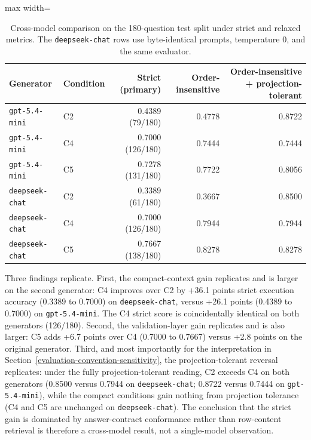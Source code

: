 \documentclass[cmc,article,submit,moreauthors,pdftex]{Definitions/tsp}
\begin{document}
\begin{table}[H]
\tablesize{\small}
\caption{Cross-model comparison on the 180-question test split under strict and relaxed metrics. The \texttt{deepseek-chat} rows use byte-identical prompts, temperature 0, and the same evaluator.}
\label{tab:second-model}
\centering
\begin{adjustbox}{max width=\textwidth}
\begin{tabular}{llrrr}
\toprule
\textbf{Generator} & \textbf{Condition} & \textbf{Strict (primary)} & \textbf{Order-insensitive} & \textbf{Order-insensitive + projection-tolerant} \\
\midrule
\texttt{gpt-5.4-mini} & C2 & 0.4389 (79/180) & 0.4778 & 0.8722 \\
\texttt{gpt-5.4-mini} & C4 & 0.7000 (126/180) & 0.7444 & 0.7444 \\
\texttt{gpt-5.4-mini} & C5 & 0.7278 (131/180) & 0.7722 & 0.8056 \\
\midrule
\texttt{deepseek-chat} & C2 & 0.3389 (61/180) & 0.3667 & 0.8500 \\
\texttt{deepseek-chat} & C4 & 0.7000 (126/180) & 0.7944 & 0.7944 \\
\texttt{deepseek-chat} & C5 & 0.7667 (138/180) & 0.8278 & 0.8278 \\
\bottomrule
\end{tabular}
\end{adjustbox}
\end{table}

Three findings replicate. First, the compact-context gain replicates and is larger on the second generator: C4 improves over C2 by +36.1 points strict execution accuracy (0.3389 to 0.7000) on \texttt{deepseek-chat}, versus +26.1 points (0.4389 to 0.7000) on \texttt{gpt-5.4-mini}. The C4 strict score is coincidentally identical on both generators (126/180). Second, the validation-layer gain replicates and is also larger: C5 adds +6.7 points over C4 (0.7000 to 0.7667) versus +2.8 points on the original generator. Third, and most importantly for the interpretation in Section~\ref{evaluation-convention-sensitivity}, the projection-tolerant reversal replicates: under the fully projection-tolerant reading, C2 exceeds C4 on both generators (0.8500 versus 0.7944 on \texttt{deepseek-chat}; 0.8722 versus 0.7444 on \texttt{gpt-5.4-mini}), while the compact conditions gain nothing from projection tolerance (C4 and C5 are unchanged on \texttt{deepseek-chat}). The conclusion that the strict gain is dominated by answer-contract conformance rather than row-content retrieval is therefore a cross-model result, not a single-model observation.
\end{document}
